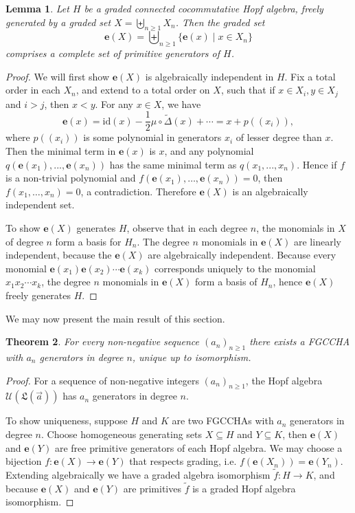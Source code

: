 \documentclass[11pt]{amsart}
\newtheorem{theorem}{Theorem}[section]
\newtheorem{lemma}[theorem]{Lemma}
\theoremstyle{definition}
\numberwithin{equation}{section}
\begin{document}
\begin{lemma}
\label{lemma:primitive generators}
    Let $H$ be a graded connected cocommutative Hopf algebra, freely generated by a graded set $X=\biguplus_{n \geq 1}X_n$.  Then the graded set
    \[
    \mathbf{e}(X) = \biguplus_{n \ge 1} \{\mathbf{e}(x) \;|\; x \in X_{n}\}
    \]
    comprises a complete set of primitive generators of $H$.
\end{lemma}
\begin{proof}
    We will first show $\mathbf{e}(X)$ is algebraically independent in $H$. Fix a total order in each $X_n$, and extend to a total order on $X$, such that if $x\in X_i, y\in X_j$ and $i>j$, then $x<y$. For any $x\in X$, we have
    \[
    \mathbf{e}(x) = \text{id} (x) - \frac{1}{2}\mu \circ \tilde{\Delta}(x) + \cdots = x + p((x_i)),
    \]
    where $p((x_i))$ is some polynomial in generators $x_i$ of lesser degree than $x$. Then the minimal term in $\mathbf{e}(x)$ is $x$, and any polynomial $q(\mathbf{e}(x_1),...,\mathbf{e}(x_n))$ has the same minimal term as $q(x_1,...,x_n)$. Hence if $f$ is a non-trivial polynomial and $f(\mathbf{e}(x_1), \ldots, \mathbf{e}(x_n)) = 0$, then $f(x_1, \ldots, x_n) = 0$, a contradiction. Therefore $\mathbf{e}(X)$ is an algebraically independent set.

    To show $\mathbf{e}(X)$ generates $H$, observe that in each degree $n$, the monomials in $X$ of degree $n$ form a basis for $H_n$. The degree $n$ monomials in $\mathbf{e}(X)$ are linearly independent, because the $\mathbf{e}(X)$ are algebraically independent. Because every monomial $\mathbf{e}(x_1)\mathbf{e}(x_2)\cdots \mathbf{e}(x_k)$ corresponds uniquely to the monomial $x_1x_2 \cdots x_k$, the degree $n$ monomials in $\mathbf{e}(X)$ form a basis of $H_n$, hence $\mathbf{e}(X)$ freely generates $H$.
\end{proof}

We may now present the main result of this section.

\begin{theorem}
\label{thm: Hopf dimension isomorphic}
    For every non-negative sequence $(a_n)_{n \geq 1}$ there exists a \textsf{FGCCHA} with $a_n$ generators in degree $n$, unique up to isomorphism.
\end{theorem}

\begin{proof}
    For a sequence of non-negative integers $(a_n)_{n \geq 1}$, the Hopf algebra $\mathcal{U}(\mathfrak{L}(\vec{a}))$ has $a_n$ generators in degree $n$.

    To show uniqueness, suppose $H$ and $K$ are two \textsf{FGCCHA}s with $a_n$ generators in degree $n$. Choose homogeneous generating sets $X\subseteq H$ and $Y \subseteq K$, then $\mathbf{e}(X)$ and $\mathbf{e}(Y)$ are free primitive generators of each Hopf algebra. We may choose a bijection $f:\mathbf{e}(X) \to \mathbf{e}(Y)$ that respects grading, i.e. $f(\mathbf{e}(X_n)) = \mathbf{e}(Y_n)$. Extending algebraically we have a graded algebra isomorphism $\tilde{f}:H \to K$, and because $\mathbf{e}(X)$ and $\mathbf{e}(Y)$ are primitives $\tilde{f}$ is a graded Hopf algebra isomorphism.
\end{proof}
\end{document}
